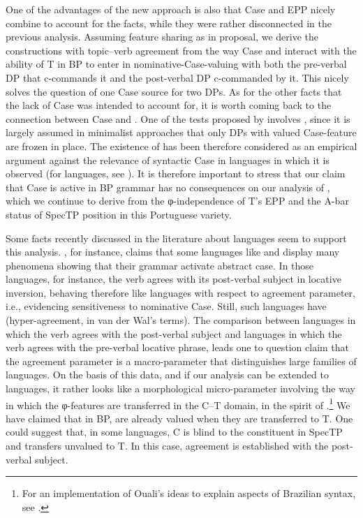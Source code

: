 \documentclass[output=paper]{langsci/langscibook}
\begin{document}
One of the advantages of the new approach is also that Case and \gls{EPP}
nicely combine to account for the facts, while they were rather disconnected in
the previous analysis. Assuming feature sharing as in 
proposal, we derive the constructions with topic--verb agreement from the way
Case and  interact with the ability of T in BP to enter in
nominative-Case-valuing with both the pre-verbal DP that c-commands it and the
post-verbal DP c-commanded by it.  This nicely solves the question of one Case
source for two DPs.  As for the other facts that the lack of Case was intended
to account for, it is worth coming back to the connection between Case and
. One of the tests proposed by \citet{SheevanderWal2018} involves
, since it is largely assumed in minimalist approaches that only
DPs with valued Case-feature are frozen in place. The existence of
 has been therefore considered as an empirical argument against
the relevance of syntactic Case in languages in which it is observed (for 
languages, see \citealt{Diercks2012}). It is therefore important to stress that
our claim that Case is active in \gls{BP} grammar has
no consequences on our analysis of , which we continue to derive
from the φ-independence of T’s \gls{EPP} and the A-bar status of SpecTP
position in this Portuguese variety.

Some facts recently discussed in the literature about  languages seem to
support this analysis. , for instance, claims that
some  languages like  and  display many
phenomena showing that their grammar activate abstract case. In those
languages, for instance, the verb agrees with its post-verbal subject in
locative inversion, behaving therefore like  languages with
respect to  agreement parameter, i.e., evidencing
sensitiveness to nominative Case. Still, such languages have 
(hyper-agreement, in van der Wal’s terms).  The comparison between 
languages in which the verb agrees with the post-verbal subject and 
languages in which the verb agrees with the pre-verbal locative phrase, leads
one to question  claim that the agreement parameter is a
macro-parameter that distinguishes large families of languages. On the basis of
this data, and if our analysis can be extended to  languages, it rather
looks like a morphological micro-parameter involving the way in which the
φ-features are transferred in the C--T domain, in the spirit of
\citet{Ouali2008}.\footnote{For an implementation of Ouali’s ideas to explain
aspects of Brazilian syntax, see \citet{Toniette2013}.} We have claimed that in
BP,  are already valued when they are transferred to T.  One could
suggest that, in some languages, C is blind to the constituent in SpecTP and
transfers unvalued  to T. In this case, agreement is established with
the post-verbal subject.
\end{document}
